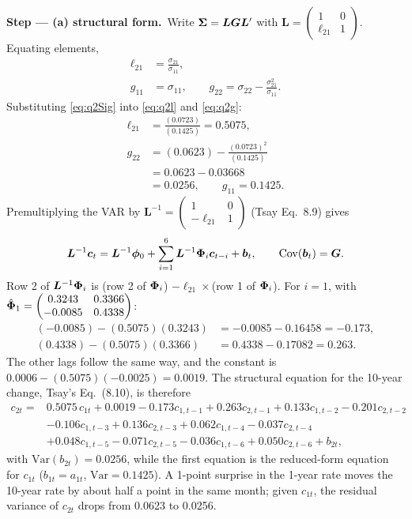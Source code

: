 \documentclass[11pt,a4paper]{article}
\newcommand{\passo}[2]{\par\smallskip\noindent\textbf{Step --- #1.}~#2}
\begin{document}
\begin{sol}
\passo{(a) structural form}{Write $\bm{\Sigma}=\bm L\bm G\bm L'$ with
$\bm L=\begin{pmatrix}1&0\\ \ell_{21}&1\end{pmatrix}$. Equating elements,
\begin{align}
\ell_{21}&=\frac{\sigma_{21}}{\sigma_{11}},\label{eq:q2l}\\
g_{11}&=\sigma_{11},\qquad g_{22}=\sigma_{22}-\frac{\sigma_{21}^2}{\sigma_{11}}.\label{eq:q2g}
\end{align}
Substituting \eqref{eq:q2Sig} into \eqref{eq:q2l} and \eqref{eq:q2g}:
\begin{align}
\ell_{21}&=\frac{(0.0723)}{(0.1425)}=0.5075,\nonumber\\
g_{22}&=(0.0623)-\frac{(0.0723)^2}{(0.1425)}\nonumber\\
&=0.0623-0.03668\nonumber\\
&=0.0256,\qquad g_{11}=0.1425.\nonumber
\end{align}
Premultiplying the VAR by $\bm L^{-1}=\begin{pmatrix}1&0\\-\ell_{21}&1\end{pmatrix}$ (Tsay Eq.~8.9) gives
\begin{equation}
\bm L^{-1}\bm c_t=\bm L^{-1}\bm{\phi}_0+\sum_{i=1}^{6}\bm L^{-1}\bm{\Phi}_i\bm c_{t-i}+\bm{b}_t,\qquad \mathrm{Cov}(\bm{b}_t)=\bm G.\label{eq:q2str}
\end{equation}
Row 2 of $\bm L^{-1}\bm{\Phi}_i$ is (row 2 of $\bm{\Phi}_i$) $-\ell_{21}\times$(row 1 of $\bm{\Phi}_i$). For $i=1$, with
$\hat{\bm{\Phi}}_1=\begin{pmatrix}0.3243&0.3366\\-0.0085&0.4338\end{pmatrix}$:
\begin{align}
(-0.0085)-(0.5075)(0.3243)&=-0.0085-0.16458=-0.173,\nonumber\\
(0.4338)-(0.5075)(0.3366)&=0.4338-0.17082=0.263.\nonumber
\end{align}
The other lags follow the same way, and the constant is $0.0006-(0.5075)(-0.0025)=0.0019$. The
structural equation for the 10-year change, Tsay's Eq.~(8.10), is therefore
\begin{align}
c_{2t}={}&0.5075\,c_{1t}+0.0019-0.173c_{1,t-1}+0.263c_{2,t-1}+0.133c_{1,t-2}-0.201c_{2,t-2}\nonumber\\
&-0.106c_{1,t-3}+0.136c_{2,t-3}+0.062c_{1,t-4}-0.037c_{2,t-4}\nonumber\\
&+0.048c_{1,t-5}-0.071c_{2,t-5}-0.036c_{1,t-6}+0.050c_{2,t-6}+b_{2t},\nonumber
\end{align}
with $\mathrm{Var}(b_{2t})=0.0256$, while the first equation is the reduced-form equation for $c_{1t}$
($b_{1t}=a_{1t}$, $\mathrm{Var}=0.1425$). A 1-point surprise in the 1-year rate moves the 10-year rate by
about half a point in the same month; given $c_{1t}$, the residual variance of $c_{2t}$ drops from 0.0623 to 0.0256.}


\end{sol}
\end{document}
